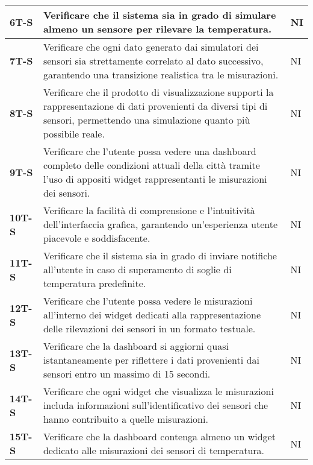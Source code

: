 \begin{longtable}{|>{\raggedright\arraybackslash}m{}|>{\raggedright\arraybackslash}m{}|>{\raggedright\arraybackslash}m{}|}
	\hline
	\textbf{6T-S}   & Verificare che il sistema sia in grado di simulare almeno un sensore per rilevare la temperatura.                                                                                  & NI             \\
	\hline
	\textbf{7T-S}   & Verificare che ogni dato generato dai simulatori dei sensori sia strettamente correlato al dato successivo, garantendo una transizione realistica tra le misurazioni.              & NI             \\
	\hline
	\textbf{8T-S}   & Verificare che il prodotto di visualizzazione supporti la rappresentazione di dati provenienti da diversi tipi di sensori, permettendo una simulazione quanto più possibile reale. & NI             \\
	\hline
	\textbf{9T-S}   & Verificare che l'utente possa vedere una dashboard completo delle condizioni attuali della città tramite l'uso di appositi widget rappresentanti le misurazioni dei sensori.       & NI             \\
	\hline
	\textbf{10T-S}  & Verificare la facilità di comprensione e l'intuitività dell'interfaccia grafica, garantendo un'esperienza utente piacevole e soddisfacente.                                        & NI             \\
	\hline
	\textbf{11T-S}  & Verificare che il sistema sia in grado di inviare notifiche all'utente in caso di superamento di soglie di temperatura predefinite.                                                & NI             \\
	\hline
	\textbf{12T-S}  & Verificare che l’utente possa vedere le misurazioni all’interno dei widget dedicati alla rappresentazione delle rilevazioni dei sensori in un formato testuale.                    & NI             \\
	\hline
	\textbf{13T-S}  & Verificare che la dashboard si aggiorni quasi istantaneamente per riflettere i dati provenienti dai sensori entro un massimo di 15 secondi.                                        & NI             \\
	\hline
	\textbf{14T-S}  & Verificare che ogni widget che visualizza le misurazioni includa informazioni sull’identificativo dei sensori che hanno contribuito a quelle misurazioni.                          & NI             \\
	\hline
	\textbf{15T-S}  & Verificare che la dashboard contenga almeno un widget dedicato alle misurazioni dei sensori di temperatura.                                                                        & NI             \\

\end{longtable}
